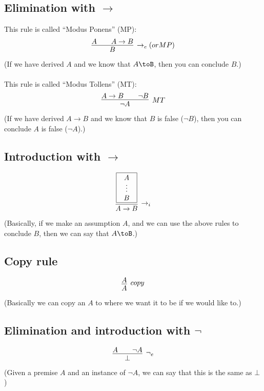 \documentclass{article}
\newcommand{\rulename}[1]{#1}
\begin{document}
  \subsection*{Elimination with $\to$}
      This rule is called ``Modus Ponens'' (MP):
      \begin{align*}
        \infer[\rulename{\to_e} (or \rulename{MP})]
        {B}
        {A && A \to B}
      \end{align*}
      (If we have derived $A$ and we know that $A\toB$, then you can conclude $B$.)
      \\\\This rule is called ``Modus Tollens'' (MT):
      \begin{align*}
        \infer[\rulename{MT}]
        {\neg A}
        {A \to B && \neg B}
      \end{align*}
      (If we have derived $A \to B$ and we know that $B$ is false ($\neg B$), then you can conclude $A$ is false ($\neg A$).)
      
  \subsection*{Introduction with $\to$}
      \begin{align*}
        \infer[\rulename{\to_i}]
        {A \to B}
        {
          \framebox{\parbox{.8cm}{\centerline{$A$}\centerline{$\vdots$}\centerline{$B$}}}
        }
      \end{align*}
      (Basically, if we make an assumption $A$, and we can use the above rules to conclude $B$, then we can say that $A\toB$.)
      
  \subsection*{Copy rule}
      \begin{align*}
        \infer[\rulename{copy}]
        {A}
        {A}
      \end{align*}
      (Basically we can copy an $A$ to where we want it to be if we would like to.)

  \subsection*{Elimination and introduction with $\neg$}
      \begin{align*}
        \infer[\rulename{\neg_e}]
        {\bot}
        {A && \neg A}
      \end{align*}
      (Given a premise $A$ and an instance of $\neg A$, we can say that this is the same as $\bot$)
      
\end{document}
